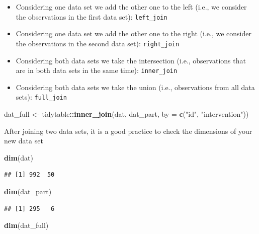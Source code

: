 \documentclass[
]{article}
\newenvironment{Shaded}{\begin{snugshade}}{\end{snugshade}}
\newcommand{\AttributeTok}[1]{\textcolor[rgb]{0.13,0.29,0.53}{#1}}
\newcommand{\FunctionTok}[1]{\textcolor[rgb]{0.13,0.29,0.53}{\textbf{#1}}}
\newcommand{\NormalTok}[1]{#1}
\newcommand{\OtherTok}[1]{\textcolor[rgb]{0.56,0.35,0.01}{#1}}
\newcommand{\SpecialCharTok}[1]{\textcolor[rgb]{0.81,0.36,0.00}{\textbf{#1}}}
\newcommand{\StringTok}[1]{\textcolor[rgb]{0.31,0.60,0.02}{#1}}
\providecommand{\tightlist}{%
  \setlength{\itemsep}{0pt}\setlength{\parskip}{0pt}}
\begin{document}
\begin{itemize}
\tightlist
\item
  Considering one data set we add the other one to the left (i.e., we
  consider the observations in the first data set): \texttt{left\_join}
\item
  Considering one data set we add the other one to the right (i.e., we
  consider the observations in the second data set):
  \texttt{right\_join}
\item
  Considering both data sets we take the intersection (i.e.,
  observations that are in both data sets in the same time):
  \texttt{inner\_join}
\item
  Considering both data sets we take the union (i.e., observations from
  all data sets): \texttt{full\_join}
\end{itemize}

\begin{Shaded}
\begin{Highlighting}[]
\NormalTok{dat\_full }\OtherTok{\textless{}{-}}\NormalTok{ tidytable}\SpecialCharTok{::}\FunctionTok{inner\_join}\NormalTok{(dat, dat\_part, }\AttributeTok{by =} \FunctionTok{c}\NormalTok{(}\StringTok{"id"}\NormalTok{, }\StringTok{"intervention"}\NormalTok{))}
\end{Highlighting}
\end{Shaded}

After joining two data sets, it is a good practice to check the
dimensions of your new data set

\begin{Shaded}
\begin{Highlighting}[]
\FunctionTok{dim}\NormalTok{(dat)}
\end{Highlighting}
\end{Shaded}

\begin{verbatim}
## [1] 992  50
\end{verbatim}

\begin{Shaded}
\begin{Highlighting}[]
\FunctionTok{dim}\NormalTok{(dat\_part)}
\end{Highlighting}
\end{Shaded}

\begin{verbatim}
## [1] 295   6
\end{verbatim}

\begin{Shaded}
\begin{Highlighting}[]
\FunctionTok{dim}\NormalTok{(dat\_full)}
\end{Highlighting}
\end{Shaded}
\end{document}

